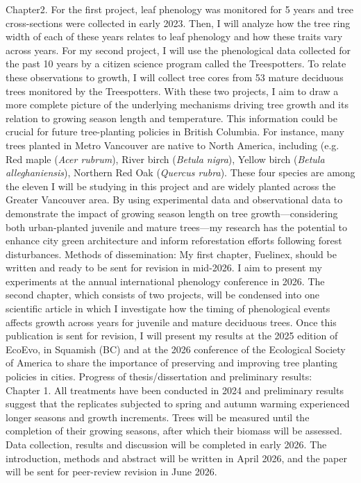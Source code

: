 \documentclass[11pt,letter]{article}
\begin{document}
Chapter2. For the first project, leaf phenology was monitored for 5 years and tree cross-sections were collected in early 2023. Then, I will analyze how the tree ring width of each of these years relates to leaf phenology and how these traits vary across years. For my second project, I will use the phenological data collected for the past 10 years by a citizen science program called the Treespotters. To relate these observations to growth, I will collect tree cores from 53 mature deciduous trees monitored by the Treespotters. With these two projects, I aim to draw a more complete picture of the underlying mechanisms driving tree growth and its relation to growing season length and temperature. This information could be crucial for future tree-planting policies in British Columbia. For instance, many trees planted in Metro Vancouver are native to North America, including (e.g. Red maple (\textit{Acer rubrum}), River birch (\textit{Betula nigra}), Yellow birch (\textit{Betula alleghaniensis}), Northern Red Oak (\textit{Quercus rubra}). These four species are among the eleven I will be studying in this project and are widely planted across the Greater Vancouver area. By using experimental data and observational data to demonstrate the impact of growing season length on tree growth—considering both urban-planted juvenile and mature trees—my research has the potential to enhance city green architecture and inform reforestation efforts following forest disturbances.
Methods of dissemination: My first chapter, Fuelinex, should be written and ready to be sent for revision in mid-2026. I aim to present my experiments at the annual international phenology conference in 2026. The second chapter, which consists of two projects, will be condensed into one scientific article in which I investigate how the timing of phenological events affects growth across years for juvenile and mature deciduous trees. Once this publication is sent for revision, I will present my results at the 2025 edition of EcoEvo, in Squamish (BC) and at the 2026 conference of the Ecological Society of America to share the importance of preserving and improving tree planting policies in cities.
Progress of thesis/dissertation and preliminary results:\\ 
Chapter 1. All treatments have been conducted in 2024 and preliminary results suggest that the replicates subjected to spring and autumn warming experienced longer seasons and growth increments. Trees will be measured until the completion of their growing seasons, after which their biomass will be assessed. Data collection, results and discussion will be completed in early 2026. The introduction, methods and abstract will be written in April 2026, and the paper will be sent for peer-review revision in June 2026.
\end{document}
